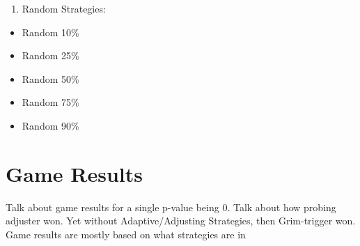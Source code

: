 \documentclass[11pt,preprint]{elsarticle}
\numberwithin{equation}{section}
\numberwithin{figure}{section}
\numberwithin{table}{section}
\def\tightlist{} %
\begin{document}
\begin{enumerate}
\def\labelenumi{\arabic{enumi}.}
\setcounter{enumi}{6}
\tightlist
\item
  Random Strategies:
\end{enumerate}

\begin{itemize}
\tightlist
\item
  Random 10\%
\item
  Random 25\%
\item
  Random 50\%
\item
  Random 75\%
\item
  Random 90\%
\end{itemize}

\section{Game Results}\label{game-results}

Talk about game results for a single p-value being 0. Talk about how
probing adjuster won. Yet without Adaptive/Adjusting Strategies, then
Grim-trigger won. Game results are mostly based on what strategies are
in

\newpage
\end{document}
